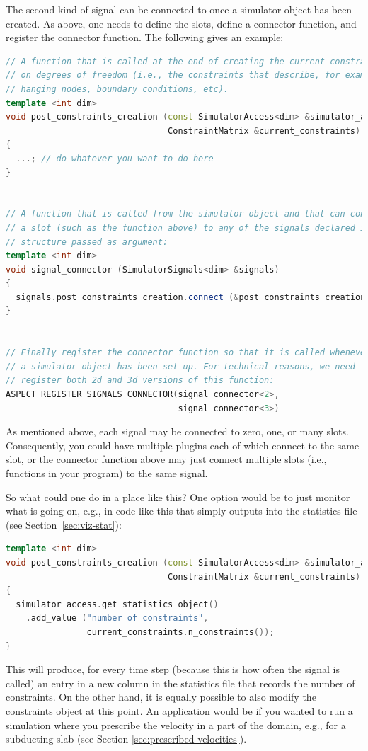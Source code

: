 \documentclass{article}
\begin{document}
The second kind of signal can be connected to once a simulator object has been
created. As above, one needs to define the slots, define a connector function,
and register the connector function. The following gives an example:
\begin{lstlisting}[frame=single,language=C++]
// A function that is called at the end of creating the current constraints
// on degrees of freedom (i.e., the constraints that describe, for example,
// hanging nodes, boundary conditions, etc).
template <int dim>
void post_constraints_creation (const SimulatorAccess<dim> &simulator_access,
                                ConstraintMatrix &current_constraints)
{
  ...; // do whatever you want to do here
}


// A function that is called from the simulator object and that can connect
// a slot (such as the function above) to any of the signals declared in the
// structure passed as argument:
template <int dim>
void signal_connector (SimulatorSignals<dim> &signals)
{
  signals.post_constraints_creation.connect (&post_constraints_creation<dim>);
}


// Finally register the connector function so that it is called whenever
// a simulator object has been set up. For technical reasons, we need to
// register both 2d and 3d versions of this function:
ASPECT_REGISTER_SIGNALS_CONNECTOR(signal_connector<2>,
                                  signal_connector<3>)
\end{lstlisting}

As mentioned above, each signal may be connected to zero, one, or many slots.
Consequently, you could have multiple plugins each of which connect to the same
slot, or the connector function above may just connect multiple slots (i.e.,
functions in your program) to the same signal.

So what could one do in a place like this? One option would be to just monitor
what is going on, e.g., in code like this that simply outputs into the
statistics file (see Section~\ref{sec:viz-stat}):
\begin{lstlisting}[frame=single,language=C++]
template <int dim>
void post_constraints_creation (const SimulatorAccess<dim> &simulator_access,
                                ConstraintMatrix &current_constraints)
{
  simulator_access.get_statistics_object()
    .add_value ("number of constraints",
                current_constraints.n_constraints());
}
\end{lstlisting}
This will produce, for every time step (because this is how often the signal is
called) an entry in a new column in the statistics file that records the number
of constraints. On the other hand, it is equally possible to also modify the
constraints object at this point. An application would be if you wanted to run a
simulation where you prescribe the velocity in a part of the domain, e.g., for a
subducting slab (see Section \ref{sec:prescribed-velocities}).
\end{document}
